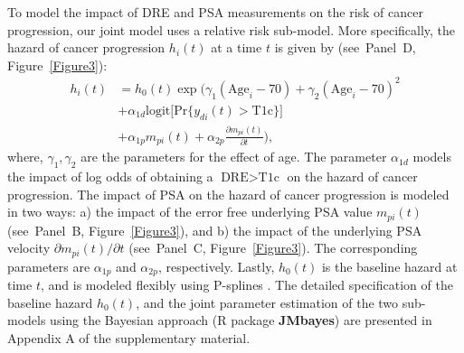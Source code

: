 \documentclass[Afour,sagev,times]{sagej}
\begin{document}
To model the impact of DRE and PSA measurements on the risk of cancer progression, our joint model uses a relative risk sub-model. More specifically, the hazard of cancer progression $h_i(t)$ at a time $t$ is given by (see~Panel~D, Figure~\ref{Figure3}):
\begin{equation}
\label{eq:rel_risk_model}
\begin{split}
    h_i(t) &= h_0(t) \exp\Big(\gamma_1 (\mbox{Age}_i-70) + \gamma_2 (\mbox{Age}_i-70)^2\\
    &+\alpha_{1d} \mbox{logit} \big[\mbox{Pr}\{y_{di}(t) > \mbox{T1c}\}\big]\\&+ \alpha_{1p} m_{pi}(t) + \alpha_{2p} \frac{\partial m_{pi}(t)}{\partial {t}}\Big),
    \end{split}
\end{equation}
where, $\gamma_1, \gamma_2$ are the parameters for the effect of age. The parameter $\alpha_{1d}$ models the impact of log odds of obtaining a $\mbox{DRE} > \mbox{T1c}$ on the hazard of cancer progression. The impact of PSA on the hazard of cancer progression is modeled in two ways: a) the impact of the error free underlying PSA value $m_{pi}(t)$ (see~Panel~B, Figure~\ref{Figure3}), and b) the impact of the underlying PSA velocity $\partial m_{pi}(t)/\partial {t}$ (see~Panel~C, Figure~\ref{Figure3}). The corresponding parameters are $\alpha_{1p}$ and $\alpha_{2p}$, respectively. Lastly, $h_0(t)$ is the baseline hazard at time $t$, and is modeled flexibly using P-splines \citep{eilers1996flexible}. The detailed specification of the baseline hazard $h_0(t)$, and the joint parameter estimation of the two sub-models using the Bayesian approach (R package \textbf{JMbayes}\cite{rizopoulosJMbayes}) are presented in Appendix A of the supplementary material.
\end{document}

